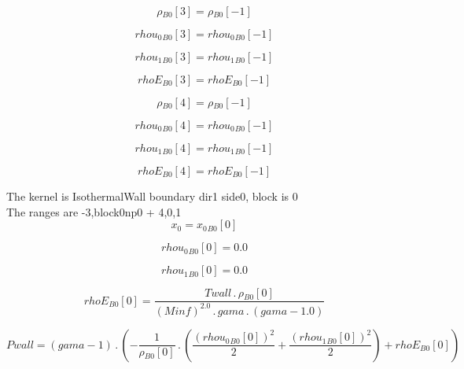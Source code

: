 \documentclass{article}
\begin{document}
\begin{dmath}{\rho{_{B0}}}[{3}] = {\rho{_{B0}}}[{-1}]\end{dmath}

\begin{dmath}{rhou_{0}{_{B0}}}[{3}] = {rhou_{0}{_{B0}}}[{-1}]\end{dmath}

\begin{dmath}{rhou_{1}{_{B0}}}[{3}] = {rhou_{1}{_{B0}}}[{-1}]\end{dmath}

\begin{dmath}{rhoE{_{B0}}}[{3}] = {rhoE{_{B0}}}[{-1}]\end{dmath}

\begin{dmath}{\rho{_{B0}}}[{4}] = {\rho{_{B0}}}[{-1}]\end{dmath}

\begin{dmath}{rhou_{0}{_{B0}}}[{4}] = {rhou_{0}{_{B0}}}[{-1}]\end{dmath}

\begin{dmath}{rhou_{1}{_{B0}}}[{4}] = {rhou_{1}{_{B0}}}[{-1}]\end{dmath}

\begin{dmath}{rhoE{_{B0}}}[{4}] = {rhoE{_{B0}}}[{-1}]\end{dmath}

\noindent The kernel is IsothermalWall boundary dir1 side0, block is 0\\\noindent The ranges are -3,block0np0 + 4,0,1\\\begin{dmath}x_{0} = {x_{0}{_{B0}}}[{0}]\end{dmath}

\begin{dmath}{rhou_{0}{_{B0}}}[{0}] = 0.0\end{dmath}

\begin{dmath}{rhou_{1}{_{B0}}}[{0}] = 0.0\end{dmath}

\begin{dmath}{rhoE{_{B0}}}[{0}] = \frac{Twall \,.\, {\rho{_{B0}}}[{0}]}{\left(Minf \right)^{2.0} \,.\, gama \,.\, \left(gama - 1.0\right)}\end{dmath}

\begin{dmath}Pwall = \left(gama - 1\right) \,.\, \left(- \frac{1}{{\rho{_{B0}}}[{0}]} \,.\, \left(\frac{\left({rhou_{0}{_{B0}}}[{0}] \right)^{2}}{2} + \frac{\left({rhou_{1}{_{B0}}}[{0}] \right)^{2}}{2}\right) + {rhoE{_{B0}}}[{0}]\right)\end{dmath}
\end{document}
